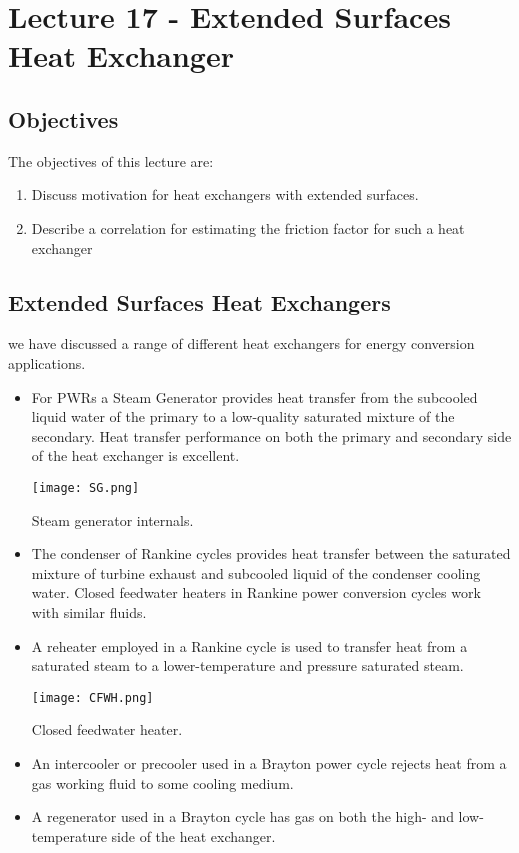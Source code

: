 \chapter{Lecture 17 - Extended Surfaces Heat Exchanger}
\label{ch:ch17}
\section{Objectives}
The objectives of this lecture are:
\begin{enumerate}
\item Discuss motivation for heat exchangers with extended surfaces.
\item Describe a correlation for estimating the friction factor for such a heat exchanger
\end{enumerate}

\section{Extended Surfaces Heat Exchangers}
 we have discussed a range of different heat exchangers for energy conversion applications.  

\begin{itemize}
\item For PWRs a Steam Generator provides heat transfer from the subcooled liquid water of the primary to a low-quality saturated mixture of the secondary.  Heat transfer performance on both the primary and secondary side of the heat exchanger is excellent.

\begin{marginfigure}
\texttt{[image: SG.png]}
\caption{Steam generator internals.}
\label{fig:SG}
\end{marginfigure}

\item The condenser of Rankine cycles provides heat transfer between the saturated mixture of turbine exhaust and subcooled liquid of the condenser cooling water.  Closed feedwater heaters in Rankine power conversion cycles work with similar fluids.

\item A reheater employed in a Rankine cycle is used to transfer heat from a saturated steam to a lower-temperature and pressure saturated steam.  

\begin{marginfigure}
\texttt{[image: CFWH.png]}
\caption{Closed feedwater heater.}
\label{fig:CFWH}
\end{marginfigure}

\item An intercooler or precooler used in a Brayton power cycle rejects heat from a gas working fluid to some cooling medium.  

\item A regenerator used in a Brayton cycle has gas on both the high- and low-temperature side of the heat exchanger.  
\end{itemize}

